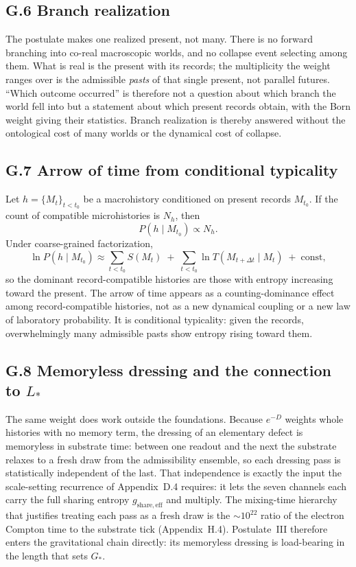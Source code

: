 \documentclass[11pt]{article}
\begin{document}
\subsection*{G.6 Branch realization}

The postulate makes one realized present, not many. There is no forward branching into co-real macroscopic worlds, and no collapse event selecting among them. What is real is the present with its records; the multiplicity the weight ranges over is the admissible \emph{pasts} of that single present, not parallel futures. ``Which outcome occurred'' is therefore not a question about which branch the world fell into but a statement about which present records obtain, with the Born weight giving their statistics. Branch realization is thereby answered without the ontological cost of many worlds or the dynamical cost of collapse.

\subsection*{G.7 Arrow of time from conditional typicality}

Let $h=\{M_t\}_{t<t_0}$ be a macrohistory conditioned on present records $M_{t_0}$. If the count of compatible microhistories is $N_h$, then
\[
P(h\mid M_{t_0})\propto N_h.
\]
Under coarse-grained factorization,
\[
\ln P(h\mid M_{t_0})
\approx
\sum_{t<t_0}S(M_t)
\;+\;
\sum_{t<t_0}\ln T(M_{t+\Delta t}\mid M_t)
\;+\;
\mathrm{const},
\]
so the dominant record-compatible histories are those with entropy increasing toward the present. The arrow of time appears as a counting-dominance effect among record-compatible histories, not as a new dynamical coupling or a new law of laboratory probability. It is conditional typicality: given the records, overwhelmingly many admissible pasts show entropy rising toward them.

\subsection*{G.8 Memoryless dressing and the connection to $L_*$}

The same weight does work outside the foundations. Because $e^{-D}$ weights whole histories with no memory term, the dressing of an elementary defect is memoryless in substrate time: between one readout and the next the substrate relaxes to a fresh draw from the admissibility ensemble, so each dressing pass is statistically independent of the last. That independence is exactly the input the scale-setting recurrence of Appendix~D.4 requires: it lets the seven channels each carry the full sharing entropy $g_{\mathrm{share,eff}}$ and multiply. The mixing-time hierarchy that justifies treating each pass as a fresh draw is the $\sim\!10^{22}$ ratio of the electron Compton time to the substrate tick (Appendix~H.4). Postulate~III therefore enters the gravitational chain directly: its memoryless dressing is load-bearing in the length that sets $G_*$.
\end{document}
